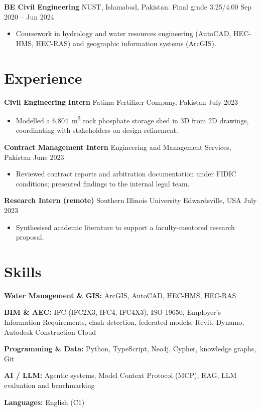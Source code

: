 \documentclass[a4paper,10.5pt]{article}
\newcommand{\datefill}{\dotfill}
\newcommand{\entry}[3]{\vspace{2.5pt}\noindent\textbf{#1} \textbar{} #2 \datefill{} #3\par\vspace{0.5pt}}
\newcommand{\skillrow}[2]{\noindent\textbf{#1:} #2\par\vspace{1pt}}
\begin{document}
\entry{BE Civil Engineering}{NUST, Islamabad, Pakistan. Final grade 3.25/4.00}{Sep 2020 -- Jun 2024}
\begin{itemize}
  \item Coursework in hydrology and water resources engineering (AutoCAD, HEC-HMS,
        HEC-RAS) and geographic information systems (ArcGIS).
\end{itemize}

\section{Experience}
\entry{Civil Engineering Intern}{Fatima Fertilizer Company, Pakistan}{July 2023}
\begin{itemize}
  \item Modelled a 6,804~m\textsuperscript{2} rock phosphate storage shed in 3D from
        2D drawings, coordinating with stakeholders on design refinement.
\end{itemize}

\entry{Contract Management Intern}{Engineering and Management Services, Pakistan}{June 2023}
\begin{itemize}
  \item Reviewed contract reports and arbitration documentation under FIDIC
        conditions; presented findings to the internal legal team.
\end{itemize}

\entry{Research Intern (remote)}{Southern Illinois University Edwardsville, USA}{July 2023}
\begin{itemize}
  \item Synthesised academic literature to support a faculty-mentored research proposal.
\end{itemize}

\section{Skills}

\skillrow{Water Management \& GIS}{ArcGIS, AutoCAD, HEC-HMS, HEC-RAS}
\skillrow{BIM \& AEC}{IFC (IFC2X3, IFC4, IFC4X3), ISO 19650, Employer's Information Requirements, clash detection, federated models, Revit, Dynamo, Autodesk Construction Cloud}
\skillrow{Programming \& Data}{Python, TypeScript, Neo4j, Cypher, knowledge graphs, Git}
\skillrow{AI / LLM}{Agentic systems, Model Context Protocol (MCP), RAG, LLM evaluation and benchmarking}

\skillrow{Languages}{English (C1)}
\end{document}
